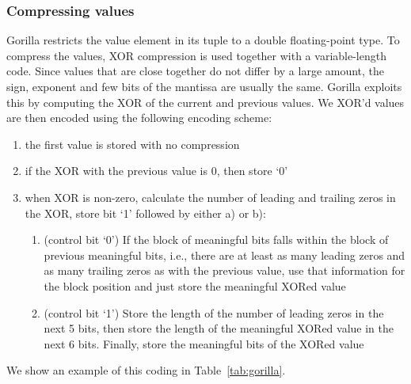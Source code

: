 \subsubsection{Compressing values}
Gorilla restricts the value element in its tuple to a double floating-point type. To compress
the values, XOR compression is used together with a variable-length code.
Since values that are close together do not differ by a large amount, the sign, exponent and
few bits of the mantissa are usually the same. Gorilla exploits this by computing the XOR of
the current and previous values. We XOR’d values are then encoded using the following encoding
scheme:
\begin{enumerate}
    \item the first value is stored with no compression
    \item if the XOR with the previous value is 0, then store ‘0’
    \item when XOR is non-zero, calculate the number of leading and trailing zeros in the XOR,
    store bit ‘1’ followed by either a) or b):
        \begin{enumerate}
            \item (control bit ‘0’) If the block of meaningful bits falls within the block of
            previous meaningful bits, i.e., there are at least as many leading zeros and as many
            trailing zeros as with the previous value, use that information for the block position
            and just store the meaningful XORed value
            \item (control bit ‘1’) Store the length of the number of leading zeros in the next
            5 bits, then store the length of the meaningful XORed value in the next 6 bits.
            Finally, store the meaningful bits of the XORed value
        \end{enumerate}
\end{enumerate}
We show an example of this coding in Table~\ref{tab:gorilla}.

